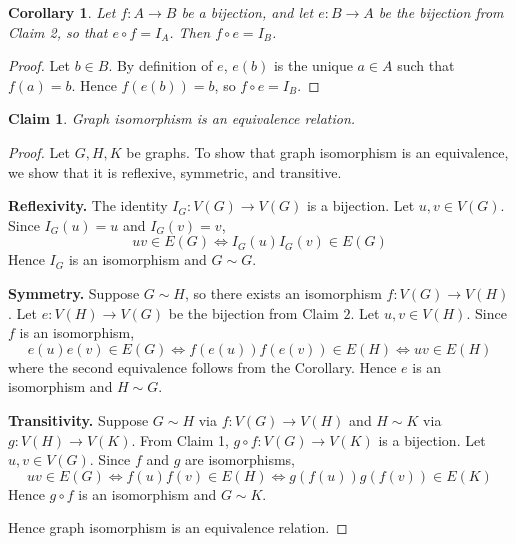 \documentclass{article}
\newtheorem{claim}{Claim}
\newtheorem*{corollary}{Corollary}
\begin{document}
\begin{corollary}
    Let $f : A \to B$ be a bijection, and let $e : B \to A$ be the bijection from Claim 2,
    so that $e \circ f = I_A$. Then $f \circ e = I_B$.
\end{corollary}

\begin{proof}
    Let $b \in B$. By definition of $e$, $e(b)$ is the unique $a \in A$ such that $f(a) = b$.
    Hence $f(e(b)) = b$, so $f \circ e = I_B$.
\end{proof}

\begin{claim}
    Graph isomorphism is an equivalence relation.
\end{claim}

\begin{proof}
    Let $G,H,K$ be graphs. To show that graph isomorphism is an equivalence, we show that it is 
    reflexive, symmetric, and transitive.

    \medskip
    \textbf{Reflexivity.}
    The identity $I_G : V(G) \to V(G)$ is a bijection. Let $u, v \in V(G)$. Since $I_G(u) = u$ and 
    $I_G(v) = v$,
    \[
    uv \in E(G) \iff I_G(u)I_G(v) \in E(G)
    \]
    Hence $I_G$ is an isomorphism and $G \sim G$.
    
    \medskip
    \textbf{Symmetry.}
    Suppose $G \sim H$, so there exists an isomorphism $f : V(G) \to V(H)$. Let $e : V(H) \to V(G)$ be 
    the bijection from Claim $2$. Let $u, v \in V(H)$. Since $f$ is an isomorphism, 
    \[
    e(u)e(v) \in E(G) \iff f(e(u))f(e(v)) \in E(H) \iff uv \in E(H)
    \]
    where the second equivalence follows from the Corollary. Hence $e$ is an isomorphism and $H \sim G$.

    \medskip
    \textbf{Transitivity.}
    Suppose $G \sim H$ via $f : V(G) \to V(H)$ and $H \sim K$ via $g : V(H) \to V(K)$. From Claim 1, 
    $g \circ f : V(G) \to V(K)$ is a bijection. Let $u, v \in V(G)$. Since $f$ and $g$ are isomorphisms,
    \[
    uv \in E(G) \iff f(u)f(v) \in E(H) \iff g(f(u))g(f(v)) \in E(K)
    \]
    Hence $g \circ f$ is an isomorphism and $G \sim K$.

    \medskip
    Hence graph isomorphism is an equivalence relation.
\end{proof}
\end{document}
